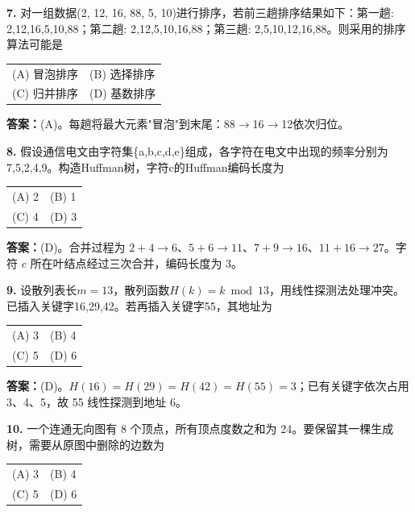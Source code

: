 \vspace{6pt}

\noindent\textbf{7.} 对一组数据(2, 12, 16, 88, 5, 10)进行排序，若前三趟排序结果如下：第一趟: 2,12,16,5,10,88；第二趟: 2,12,5,10,16,88；第三趟: 2,5,10,12,16,88。则采用的排序算法可能是
\begin{center}
\begin{tabular}{ll}
(A) 冒泡排序 & (B) 选择排序 \\[6pt]
(C) 归并排序 & (D) 基数排序
\end{tabular}
\end{center}

\ifshowsolutions\par\noindent\textbf{答案：}(A)。每趟将最大元素"冒泡"到末尾：88$\to$16$\to$12依次归位。\else \answerarea \fi

\vspace{6pt}

\noindent\textbf{8.} 假设通信电文由字符集\{a,b,c,d,e\}组成，各字符在电文中出现的频率分别为7,5,2,4,9。构造Huffman树，字符c的Huffman编码长度为
\begin{center}
\begin{tabular}{ll}
(A) 2 & (B) 1 \\[6pt]
(C) 4 & (D) 3
\end{tabular}
\end{center}

\ifshowsolutions\par\noindent\textbf{答案：}(D)。合并过程为 $2+4\to6$、$5+6\to11$、$7+9\to16$、$11+16\to27$。字符 $c$ 所在叶结点经过三次合并，编码长度为 3。\else \answerarea \fi

\vspace{6pt}

\noindent\textbf{9.} 设散列表长$m=13$，散列函数$H(k)=k\bmod 13$，用线性探测法处理冲突。已插入关键字16,29,42。若再插入关键字55，其地址为
\begin{center}
\begin{tabular}{ll}
(A) 3 & (B) 4 \\[6pt]
(C) 5 & (D) 6
\end{tabular}
\end{center}

\ifshowsolutions\par\noindent\textbf{答案：}(D)。$H(16)=H(29)=H(42)=H(55)=3$；已有关键字依次占用 3、4、5，故 55 线性探测到地址 6。\else \answerarea \fi

\vspace{6pt}

\noindent\textbf{10.} 一个连通无向图有 8 个顶点，所有顶点度数之和为 24。要保留其一棵生成树，需要从原图中删除的边数为
\begin{center}
\begin{tabular}{ll}
(A) 3 & (B) 4 \\[6pt]
(C) 5 & (D) 6
\end{tabular}
\end{center}

